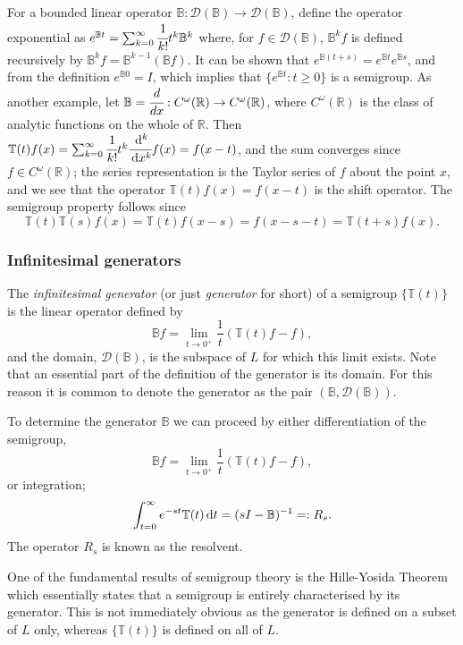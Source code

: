 For a bounded linear operator \(\mathbb B:\mathcal D(\mathbb B)\to \mathcal D(\mathbb B)\), define the operator exponential as \(e^{\mathbb Bt}=\sum_{k=0}^\infty\cfrac{1}{k!}t^k\mathbb B^k\) where, for \(f\in \mathcal D(\mathbb B)\), \(\mathbb B^kf\) is defined recursively by \(\mathbb B^k f = \mathbb B^{k-1} (\mathbb B f)\). It can be shown that \(e^{\mathbb B(t+s)}=e^{\mathbb Bt}e^{\mathbb Bs}\), and from the definition \(e^{\mathbb B0}=I\), which implies that \(\{e^{\mathbb Bt}:t\geq 0\}\) is a semigroup. As another example, let \(\mathbb B=\cfrac{d}{dx}:C^\omega(\mathbb R) \to C^\omega(\mathbb R)\), where \(C^\omega(\mathbb R)\) is the class of analytic functions on the whole of \(\mathbb R\). Then \(\mathbb T(t)f(x)=\sum_{k=0}^\infty \cfrac{1}{k!}t^k\cfrac{\, \mathrm{d}^k}{\, \mathrm{d} x^k}f(x)=f(x-t)\), and the sum converges since \(f\in C^\omega(\mathbb R)\); the series representation is the Taylor series of \(f\) about the point \(x\), and we see that the operator \(\mathbb T(t)f(x)=f(x-t)\) is the shift operator. The semigroup property follows since 
\[\mathbb T(t)\mathbb T(s)f(x)=\mathbb T(t)f(x-s)=f(x-s-t)=\mathbb T(t+s)f(x).\]

\subsubsection{Infinitesimal generators} The \emph{infinitesimal generator} (or just \emph{generator} for short) of a semigroup \(\{\mathbb T(t)\}\) is the linear operator defined by 
\[\mathbb Bf = \lim\limits_{t\to 0^+}\frac{1}{t}(\mathbb T(t)f-f),\]
and the domain, \(\mathcal D(\mathbb B)\), is the subspace of \(L\) for which this limit exists. Note that an essential part of the definition of the generator is its domain. For this reason it is common to denote the generator as the pair \((\mathbb B,\mathcal D(\mathbb B))\). 

To determine the generator \(\mathbb B\) we can proceed by either differentiation of the semigroup, 
\[\mathbb Bf = \lim\limits_{t\to 0^+}\frac{1}{t}(\mathbb T(t)f-f),\]
or integration;
\[\int_{t=0}^\infty e^{-st}\mathbb T(t)\, \mathrm{d} t = (sI-\mathbb B)^{-1}=:R_s.\]
The operator \(R_s\) is known as the resolvent. 

One of the fundamental results of semigroup theory is the Hille-Yosida Theorem which essentially states that a semigroup is entirely characterised by its generator. This is not immediately obvious as the generator is defined on a subset of \(L\) only, whereas \(\{\mathbb T(t)\}\) is defined on all of \(L\).

